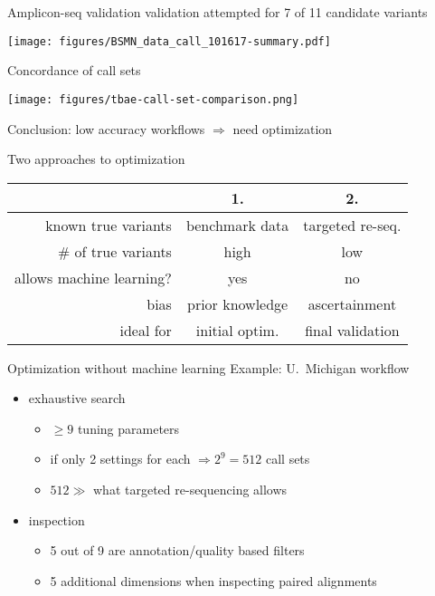 \documentclass{beamer}
\begin{document}
\begin{frame}{Amplicon-seq validation}
{validation attempted for 7 of 11 candidate variants}
\begin{center}
\texttt{[image: figures/BSMN\_data\_call\_101617-summary.pdf]}
\end{center}
\end{frame}

\begin{frame}{Concordance of call sets}
\begin{center}
\texttt{[image: figures/tbae-call-set-comparison.png]}
\end{center}
\end{frame}

\begin{frame}{Conclusion: low accuracy workflows \(\Rightarrow\) need
optimization}
\begin{center}
{\Large Two approaches to optimization}
\vfill
\begin{tabular}{r|c|c}
 & 1. & 2. \\
\hline
known true variants & benchmark data & targeted re-seq. \\
\# of true variants & high & low \\
allows machine learning? & yes & no \\
bias & prior knowledge & ascertainment \\
ideal for & initial optim. & final validation \\
\end{tabular}
\end{center}
\end{frame}

\begin{frame}{Optimization without machine learning}
{Example: U.~Michigan workflow}
\begin{itemize}
\item 
exhaustive search
\begin{itemize}
\item \(\ge 9\) tuning parameters
\item if only 2 settings for each \(\Rightarrow 2^9 = 512\) call sets
\item \(512 \gg\) what targeted re-sequencing allows
\end{itemize}
\item<2-> inspection
\begin{itemize}
\item 5 out of 9 are annotation/quality based filters
\item 5 additional dimensions when inspecting paired alignments
\end{itemize}
\end{itemize}
\end{frame}
\end{document}
